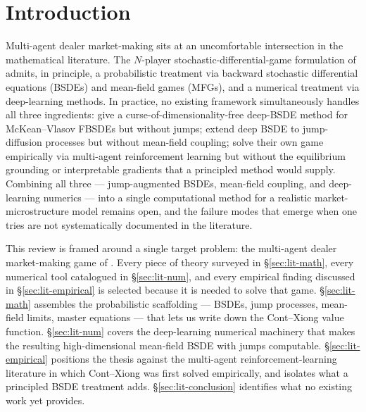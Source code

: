 
\section{Introduction}\label{sec:lit-intro}

Multi-agent dealer market-making sits at an uncomfortable
intersection in the mathematical literature.  The $N$-player
stochastic-differential-game formulation of \citet{cont2024}
admits, in principle, a probabilistic treatment via backward
stochastic differential equations (BSDEs) and mean-field games
(MFGs), and a numerical treatment via deep-learning methods.  In practice, no
existing framework simultaneously handles all three ingredients:
\citet{han2022} give a curse-of-dimensionality-free deep-BSDE
method for McKean--Vlasov FBSDEs but without jumps;
\citet{wang2023} extend deep BSDE to jump-diffusion processes but
without mean-field coupling; \citet{cont2024} solve their own
game empirically via multi-agent reinforcement learning but
without the equilibrium grounding or interpretable gradients that
a principled method would supply.  Combining all three ---
jump-augmented BSDEs, mean-field coupling, and deep-learning
numerics --- into a single computational method for a realistic
market-microstructure model remains open, and the failure modes
that emerge when one tries are not systematically documented in
the literature.

This review is framed around a single target problem: the multi-agent
dealer market-making game of \citet{cont2024}.  Every piece of theory
surveyed in \S\ref{sec:lit-math}, every numerical tool catalogued in
\S\ref{sec:lit-num}, and every empirical finding discussed in
\S\ref{sec:lit-empirical} is selected because it is needed to solve
that game.  \S\ref{sec:lit-math} assembles the probabilistic
scaffolding --- BSDEs, jump processes, mean-field limits, master
equations --- that lets us write down the Cont--Xiong value function.
\S\ref{sec:lit-num} covers the deep-learning numerical machinery that
makes the resulting high-dimensional mean-field BSDE with jumps
computable.  \S\ref{sec:lit-empirical} positions the thesis against
the multi-agent reinforcement-learning literature in which
Cont--Xiong was first solved empirically, and isolates what a
principled BSDE treatment adds.  \S\ref{sec:lit-conclusion}
identifies what no existing work yet provides.

